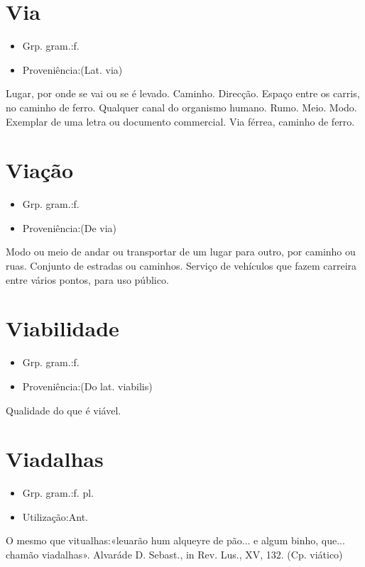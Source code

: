 \documentclass{article}
\begin{document}
\section{Via}
\begin{itemize}
\item {Grp. gram.:f.}
\end{itemize}
\begin{itemize}
\item {Proveniência:(Lat. \textunderscore via\textunderscore )}
\end{itemize}
Lugar, por onde se vai ou se é levado.
Caminho.
Direcção.
Espaço entre os carris, no caminho de ferro.
Qualquer canal do organismo humano.
Rumo.
Meio.
Modo.
Exemplar de uma letra ou documento commercial.
\textunderscore Via férrea\textunderscore , caminho de ferro.
\section{Viação}
\begin{itemize}
\item {Grp. gram.:f.}
\end{itemize}
\begin{itemize}
\item {Proveniência:(De \textunderscore via\textunderscore )}
\end{itemize}
Modo ou meio de andar ou transportar de um lugar para outro, por caminho ou ruas.
Conjunto de estradas ou caminhos.
Serviço de vehículos que fazem carreira entre vários pontos, para uso público.
\section{Viabilidade}
\begin{itemize}
\item {Grp. gram.:f.}
\end{itemize}
\begin{itemize}
\item {Proveniência:(Do lat. \textunderscore viabilis\textunderscore )}
\end{itemize}
Qualidade do que é viável.
\section{Viadalhas}
\begin{itemize}
\item {Grp. gram.:f. pl.}
\end{itemize}
\begin{itemize}
\item {Utilização:Ant.}
\end{itemize}
O mesmo que \textunderscore vitualhas\textunderscore :«\textunderscore leuarão hum alqueyre de pão... e algum binho, que... chamão viadalhas\textunderscore ». \textunderscore Alvará\textunderscore  de D. Sebast., in \textunderscore Rev. Lus.\textunderscore , XV, 132.
(Cp. \textunderscore viático\textunderscore )
\end{document}
